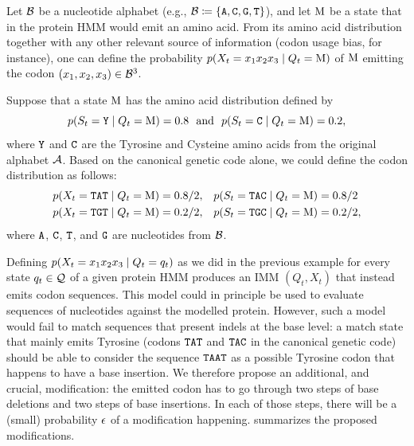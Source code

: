 Let $\mathcal{B}$ be a nucleotide alphabet (e.g., $\mathcal{B} \coloneqq \{\mathtt{A}, \mathtt{C}, \mathtt{G},
\mathtt{T}\}$), and let $\mathrm{M}$ be a state that in the protein HMM would emit an amino acid. From
its amino acid distribution together with any other relevant source of information (codon usage
bias, for instance), one can define the probability $p(X_t=x_1x_2x_3 \;|\; Q_t=\mathrm{M})$ of
$\mathrm{M}$ emitting the codon $(x_1, x_2, x_3) \in \mathcal{B}^3$.

\begin{example}
  Suppose that a state $\mathrm{M}$ has the amino acid distribution defined by
  \begin{equation*}
    p(S_t=\mathtt{Y} \;|\; Q_t=\mathrm{M}) = 0.8 ~~\text{and}~~ p(S_t=\mathtt{C} \;|\; Q_t=\mathrm{M}) = 0.2,
  \end{equation*}
  where $\mathtt{Y}$ and $\mathtt{C}$ are the Tyrosine and Cysteine amino acids from the original alphabet
  $\mathcal{A}$. Based on the canonical genetic code alone, we could define the codon distribution as
  follows:
  \begin{equation*}
    \begin{split}
      p(X_t=\mathtt{TAT}\;|\; Q_t=\mathrm{M})= 0.8/2, &\quad p(S_t=\mathtt{TAC}\;|\; Q_t=\mathrm{M})=0.8/2\\
      p(X_t=\mathtt{TGT}\;|\; Q_t=\mathrm{M})= 0.2/2, &\quad p(S_t=\mathtt{TGC}\;|\; Q_t=\mathrm{M})=0.2/2,
    \end{split}
  \end{equation*}
  where $\mathtt{A}$, $\mathtt{C}$, $\mathtt{T}$, and $\mathtt{G}$ are nucleotides from $\mathcal{B}$.
\end{example}

Defining $p(X_t=x_1x_2x_3 \;|\; Q_t=q_t)$ as we did in the previous example for every state $q_t \in
\mathcal{Q}$ of a given protein HMM produces an IMM $(Q_t, X_t)$ that instead emits codon sequences.
This model could in principle be used to evaluate sequences of nucleotides against the modelled
protein. However, such a model would fail to match sequences that present indels at the base level:
a match state that mainly emits Tyrosine (codons $\mathtt{TAT}$ and $\mathtt{TAC}$ in the canonical
genetic code) should be able to consider the sequence $\mathtt{TAAT}$ as a possible Tyrosine codon that
happens to have a base insertion. We therefore propose an additional, and crucial, modification: the
emitted codon has to go through two steps of base deletions and two steps of base insertions. In
each of those steps, there will be a (small) probability $\epsilon$ of a modification happening.
 summarizes the proposed modifications.

